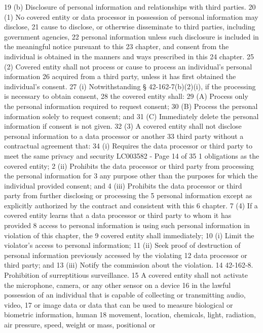 19 (b) Disclosure of personal information and relationships with third parties.
20 (1) No covered entity or data processor in possession of personal information may disclose,
21 cause to disclose, or otherwise disseminate to third parties, including government agencies,
22 personal information unless such disclosure is included in the meaningful notice pursuant to this
23 chapter, and consent from the individual is obtained in the manners and ways prescribed in this
24 chapter.
25 (2) Covered entity shall not process or cause to process an individual's personal information
26 acquired from a third party, unless it has first obtained the individual's consent.
27 (i) Notwithstanding § 42-162-7(b)(2)(i), if the processing is necessary to obtain consent,
28 the covered entity shall:
29 (A) Process only the personal information required to request consent;
30 (B) Process the personal information solely to request consent; and
31 (C) Immediately delete the personal information if consent is not given.
32 (3) A covered entity shall not disclose personal information to a data processor or another
33 third party without a contractual agreement that:
34 (i) Requires the data processor or third party to meet the same privacy and security 
LC003582 - Page 14 of 35
1 obligations as the covered entity;
2 (ii) Prohibits the data processor or third party from processing the personal information for
3 any purpose other than the purposes for which the individual provided consent; and
4 (iii) Prohibits the data processor or third party from further disclosing or processing the
5 personal information except as explicitly authorized by the contract and consistent with this
6 chapter.
7 (4) If a covered entity learns that a data processor or third party to whom it has provided
8 access to personal information is using such personal information in violation of this chapter, the
9 covered entity shall immediately;
10 (i) Limit the violator’s access to personal information;
11 (ii) Seek proof of destruction of personal information previously accessed by the violating
12 data processor or third party; and
13 (iii) Notify the commission about the violation.
14 42-162-8. Prohibition of surreptitious surveillance.
15 A covered entity shall not activate the microphone, camera, or any other sensor on a device
16 in the lawful possession of an individual that is capable of collecting or transmitting audio, video,
17 or image data or data that can be used to measure biological or biometric information, human
18 movement, location, chemicals, light, radiation, air pressure, speed, weight or mass, positional or
